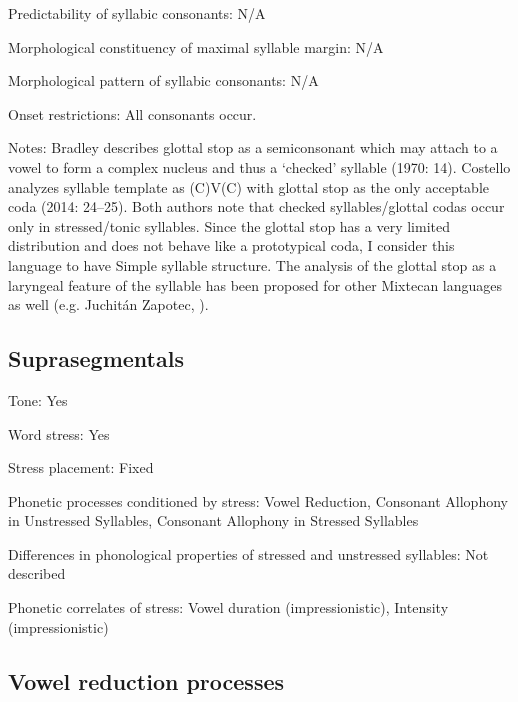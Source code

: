 {\begin{appendixdesc}
\item[Predictability of syllabic consonants:] N/A

\item[Morphological constituency of maximal syllable margin:] N/A

\item[Morphological pattern of syllabic consonants:] N/A

\item[Onset restrictions:] All consonants occur.

\item[Notes:] Bradley describes glottal stop as a semiconsonant which may attach to a vowel to form a complex nucleus and thus a ‘checked’ syllable (1970: 14). Costello analyzes syllable template as (C)V(C) with glottal stop as the only acceptable coda (2014: 24--25). Both authors note that checked syllables/glottal codas occur only in stressed/tonic syllables. Since the glottal stop has a very limited distribution and does not behave like a prototypical coda, I consider this language to have Simple syllable structure. The analysis of the glottal stop as a laryngeal feature of the syllable has been proposed for other Mixtecan languages as well (e.g. Juchitán Zapotec, \citealt{MarlettPickett1987}).
\end{appendixdesc}
\subsection*{Suprasegmentals}
\begin{appendixdesc}
\item[Tone:] Yes

\item[Word stress:] Yes

\item[Stress placement:] Fixed

\item[Phonetic processes conditioned by stress:] Vowel Reduction, Consonant Allophony in Unstressed Syllables, Consonant Allophony in Stressed Syllables

\item[Differences in phonological properties of stressed and unstressed syllables:] Not described

\item[Phonetic correlates of stress:] Vowel duration (impressionistic), Intensity (impressionistic)
\end{appendixdesc}
\subsection*{Vowel reduction processes}
\begin{appendixdesc}


\end{appendixdesc}}
